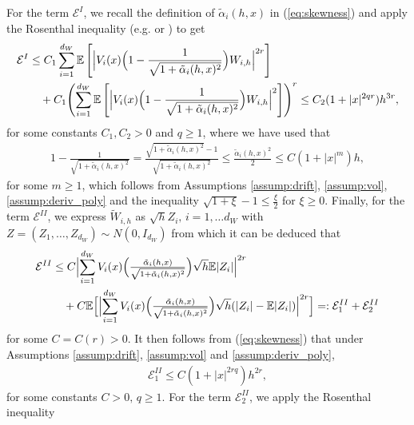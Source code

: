 \documentclass[11pt]{article}
\begin{document}
% 
For the term $\mathcal{E}^I$, we recall the definition of $\tilde{\alpha}_{i} (h,x)$ in (\ref{eq:skewness}) and apply the Rosenthal inequality (e.g. \cite{Rose:70} or \cite[Lemma A.2.]{Soni:25}) to get 
% 
\begin{align*}
\mathcal{E}^I 
& \le C_1   \sum_{i = 1}^{d_W} \mathbb{E} \left[
\Bigl| V_{i} (x)  \Bigl( 1 - \frac{1}{\sqrt{1 + \tilde{\alpha}_i (h, x)^2}} \Bigr) W_{i, h}  \Bigr|^{2r} \right] \\ 
& \quad  + C_1 \Biggl( \sum_{i = 1}^{d_W} 
\mathbb{E} \left[
\Bigl| V_{i} (x)  \Bigl( 1 - \frac{1}{\sqrt{1 + \tilde{\alpha}_i (h, x)^2}} \Bigr) W_{i, h}  \Bigr|^{2} \right] \Biggr)^{r} 
\le C_2 (1 + |x|^{2qr}) h^{3r}, 
\end{align*}
% 
for some constants $C_1, C_2 > 0$ and $q \ge 1$, where we have used that 
% 
\begin{align}
1 - \frac{1}{\sqrt{1 + \tilde{\alpha}_i (h, x)^2}} =  \frac{\sqrt{1 + \tilde{\alpha}_i (h, x)^2}- 1}{\sqrt{1 + \tilde{\alpha}_i (h, x)^2}} \le \frac{\tilde{\alpha}_i (h, x)^2}{2}
\le C ( 1 + |x|^m) h,
\end{align}
% 
for some $m \ge 1$, which follows from Assumptions \ref{assump:drift}, \ref{assump:vol}, \ref{assump:deriv_poly} and the inequality $\sqrt{1 + \xi} - 1 \le \tfrac{\xi}{2}$ for $\xi \ge 0$. Finally, for the term $\mathcal{E}^{II}$, we express $\widetilde{W}_{i,h}$ as $\sqrt{h} Z_i, \, i = 1,\ldots d_W$ with $Z = (Z_1, \ldots, Z_{d_W}) \sim N(0,I_{d_W})$ from which it can be deduced that
% 
\begin{align*}
\mathcal{E}^{II} & \le 
C 
\Bigl| \sum_{i = 1}^{d_W} 
V_{i} (x)  \Bigl( \tfrac{\tilde{\alpha}_i (h, x)}{\sqrt{1 + \tilde{\alpha}_i (h, x)^2}} \Bigr) \sqrt{h} \mathbb{E} |Z_i| \Bigr|^{2r} \\
& \quad + C \mathbb{E} \Bigl[ 
\Bigl| \sum_{i = 1}^{d_W} 
V_{i} (x)  \Bigl( \tfrac{\tilde{\alpha}_i (h, x)}{\sqrt{1 + \tilde{\alpha}_i (h, x)^2}} \Bigr) \sqrt{h} (|Z_i| - \mathbb{E} |Z_i| )\Bigr|^{2r} \Bigr] =: \mathcal{E}^{II}_1 + \mathcal{E}_2^{II} 
\end{align*} 
% 
for some $C = C(r) > 0$. It then follows from (\ref{eq:skewness}) that under Assumptions \ref{assump:drift}, \ref{assump:vol} and \ref{assump:deriv_poly}, 
% 
\begin{align} \label{eq:E_II_1}
\mathcal{E}_1^{II} \le C (1 + |x|^{2rq}) h^{2r}, 
\end{align}
% 
for some constants $C > 0, \, q \ge 1$. For the term $\mathcal{E}_2^{II}$, we apply the Rosenthal inequality 
\end{document}
